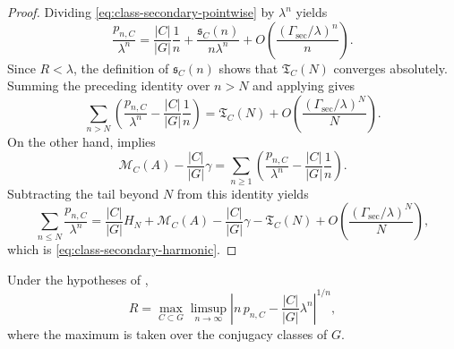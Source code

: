 \begin{proof}
  Dividing \eqref{eq:class-secondary-pointwise} by \(\lambda^n\) yields
  \[
    \frac{p_{n,C}}{\lambda^n}
    =
    \frac{|C|}{|G|}\frac{1}{n}
    +\frac{\mathfrak s_C(n)}{n\lambda^n}
    +O\!\left(\frac{(\Gamma_{\mathrm{sec}}/\lambda)^n}{n}\right).
  \]
  Since \(R<\lambda\), the definition of \(\mathfrak s_C(n)\) shows
  that \(\mathfrak T_C(N)\) converges absolutely. Summing the preceding
  identity over \(n>N\) and applying
   gives
  \[
    \sum_{n>N}
      \left(
        \frac{p_{n,C}}{\lambda^n}
        -\frac{|C|}{|G|}\frac{1}{n}
      \right)
    =
    \mathfrak T_C(N)
    +O\!\left(\frac{(\Gamma_{\mathrm{sec}}/\lambda)^N}{N}\right).
  \]
  On the other hand,  implies
  \[
    \mathcal M_C(A)-\frac{|C|}{|G|}\gamma
    =
    \sum_{n\ge 1}
      \left(
        \frac{p_{n,C}}{\lambda^n}
        -\frac{|C|}{|G|}\frac{1}{n}
      \right).
  \]
  Subtracting the tail beyond \(N\) from this identity yields
  \[
    \sum_{n\le N}\frac{p_{n,C}}{\lambda^n}
    =
    \frac{|C|}{|G|}H_N
    +\mathcal M_C(A)-\frac{|C|}{|G|}\gamma
    -\mathfrak T_C(N)
    +O\!\left(\frac{(\Gamma_{\mathrm{sec}}/\lambda)^N}{N}\right),
  \]
  which is \eqref{eq:class-secondary-harmonic}.
\end{proof}

\begin{corollary}
  \label{cor:class-secondary-term-detects-spectrum}
  Under the hypotheses of ,
  \[
    R
    =
    \max_{C\subset G}
      \limsup_{n\to\infty}
      \left|
        n\,p_{n,C}-\frac{|C|}{|G|}\lambda^n
      \right|^{1/n},
  \]
  where the maximum is taken over the conjugacy classes of \(G\).
\end{corollary}

